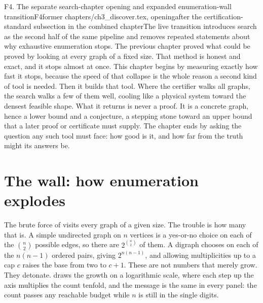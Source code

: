 \begin{offcutrewrite}{F4. The separate search-chapter opening and expanded enumeration-wall transition}{F4}{former chapters/ch3\_discover.tex, opening}{after the certification-standard subsection in the combined chapter}{The live transition introduces search as the second half of the same pipeline and removes repeated statements about why exhaustive enumeration stops.}
The previous chapter proved what could be proved by looking at every graph of a fixed size. That method is honest and exact, and it stops almost at once. This chapter begins by measuring exactly how fast it stops, because the speed of that collapse is the whole reason a second kind of tool is needed. Then it builds that tool. Where the certifier walks all graphs, the search walks a few of them well, cooling like a physical system toward the densest feasible shape. What it returns is never a proof. It is a concrete graph, hence a lower bound and a conjecture, a stepping stone toward an upper bound that a later proof or certificate must supply. The chapter ends by asking the question any such tool must face: how good is it, and how far from the truth might its answers be.

\section{The wall: how enumeration explodes}

The brute force of  visits every graph of a given size. The trouble is how many that is. A simple undirected graph on $n$ vertices is a yes-or-no choice on each of the $\binom{n}{2}$ possible edges, so there are $2^{\binom{n}{2}}$ of them. A digraph chooses on each of the $n(n-1)$ ordered pairs, giving $2^{n(n-1)}$, and allowing multiplicities up to a cap $c$ raises the base from two to $c + 1$. These are not numbers that merely grow. They detonate.  draws the growth on a logarithmic scale, where each step up the axis multiplies the count tenfold, and the message is the same in every panel: the count passes any reachable budget while $n$ is still in the single digits.


\end{offcutrewrite}
